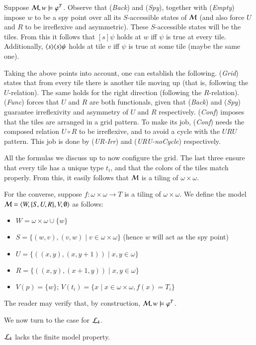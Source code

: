 \begin{pf}
Suppose $\mathcal{M},w\models\varphi^T$. Observe that (\textit{Back}) and
(\textit{Spy}), together with (\textit{Empty}) impose $w$ to be a
spy point over all its $S$-accessible states of $\mathcal{M}$ (and also
force $U$ and $R$ to be irreflexive and asymmetric). These
$S$-accessible states will be the tiles. From this it follows that
$[s]\psi$ holds at $w$ iff $\psi$ is true at every tile.
Additionally, $\langle s \rangle\langle s \rangle\psi$ holds at tile $v$ iff $\psi$ is
true at some tile (maybe the same one).

Taking the above points into account, one can establish the
following. (\textit{Grid}) states that from every tile there is
another tile moving up (that is, following the $U$-relation). The
same holds for the right direction (following the $R$-relation).
(\textit{Func}) forces that $U$ and $R$ are both functionals, given
that (\textit{Back}) and (\textit{Spy}) guarantee irreflexivity and
asymmetry of $U$ and $R$ respectively. (\textit{Conf}) imposes that
the tiles are arranged in a grid pattern. To make its job,
(\textit{Conf}) needs the composed relation $U\circ R$ to be
irreflexive, and to avoid a cycle with the $URU$ pattern. This job
is done by (\textit{UR-Irr}) and (\textit{URU-noCycle})
respectively.

All the formulas we discuss up to now configure the grid. The last
three ensure that every tile has a unique type $t_i$, and that the
colors of the tiles match properly. From this, it easily follows
that $\mathcal{M}$ is a tiling of $\omega\times\omega$.

For the converse, suppose $f:\omega\times\omega\to T$ is a tiling of
$\omega\times\omega$. We define the model
$\mathcal{M}=\langle W,\{S,U,R\},V,\emptyset \rangle$ as follows:
\begin{itemize}
\item $W=\omega\times\omega \cup \{w\}$
\item $S=\{(w,v),(v,w)\mid v\in\omega\times\omega\}$  (hence $w$ will act as the spy
point)
\item $U=\{((x,y),(x,y+1))\mid x,y\in\omega\}$
\item $R=\{((x,y),(x+1,y))\mid x,y\in\omega\}$
\item $V(p)=\{w\}$; $V(t_i)=\{x\mid x\in\omega\times\omega, f(x)=T_i\}$
\end{itemize}
The reader may verify that, by construction,
$\mathcal{M},w\models\varphi^T$.
\end{pf}

We now turn to the case for $\mathcal{L}_4$.


\begin{thm}\label{thm:tlme:inf}
$\mathcal{L}_4$ lacks the finite model property.
%
\end{thm}

